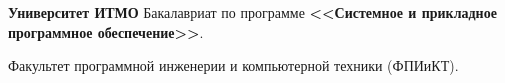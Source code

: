 

\vspace{1em}
\begin{scholarship}
     {\textbf {Университет ИТМО} \newline
     Бакалавриат по программе \textbf {<<Системное и прикладное программное обеспечение>>}.

     Факультет программной инженерии и компьютерной техники (ФПИиКТ).}
\end{scholarship}

